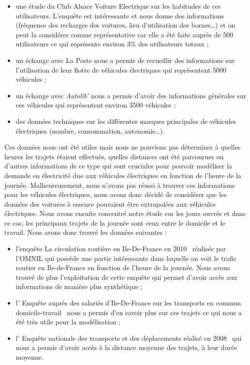 \documentclass[10pt]{article}
\begin{document}
		\begin{itemize}
			\item une étude du Club Alsace Voiture Electrique sur les habitudes de ces utilisateurs. L’enquête est intéressante et nous donne des informations (fréquence des recharges des voitures, lieu d’utilisation des bornes…) et on peut la considérer comme représentative car elle a été faite auprès de 500 utilisateurs ce qui représente environ 3\% des utilisateurs totaux ;
			\item un échange avec La Poste nous a permis de recueillir des informations sur l’utilisation de leur flotte de véhicules électriques qui représentent 5000 véhicules ;
			\item un échange avec \textit{Autolib’} nous a permis d’avoir des informations générales sur ces véhicules qui représentent environ 3500 véhicules ;
			\item des données techniques sur les différentes marques principales de véhicules électriques (nombre, consommation, autonomie…).
		\end{itemize}
		
		Ces données nous ont été utiles mais nous ne pouvions pas déterminer à quelles heures les trajets étaient effectués, quelles distances ont été parcourues ou d’autres informations de ce type qui sont cruciales pour pouvoir modéliser la demande en électricité due aux véhicules électriques en fonction de l’heure de la journée. Malheureusement, nous n’avons pas réussi à trouver ces informations pour les véhicules électriques, nous avons donc décidé de considérer que les données des voitures à essence pouvaient être extrapolées aux véhicules électriques. Nous avons ensuite concentré notre étude sur les jours ouvrés et dans ce cas, les principaux trajets de la journée sont ceux entre le domicile et le travail. Nous avons donc trouvé les données suivantes :
		
		\begin{itemize}
			\item l’enquête \og La circulation routière en Ile-De-France en 2010 \fg~réalisée par l’OMNIL qui possède une partie intéressante dans laquelle on voit le trafic routier en Ile-de-France en fonction de l’heure de la journée. Nous avons trouvé de plus l’exploitation de cette enquête qui permet d’avoir accès aux informations de manière plus synthétique ;
			\item l’ \og Enquête auprès des salariés d’Ile-De-France sur les transports en commun domicile-travail \fg~nous a permis d’en savoir plus sur ces trajets ce qui nous a  été très utile pour la modélisation ;
			\item l’ \og Enquête nationale des transports et des déplacements réalisé en 2008 \fg~qui nous a permis d’avoir accès à la distance moyenne des trajets, à leur durée moyenne.
		\end{itemize}
		
\end{document}
